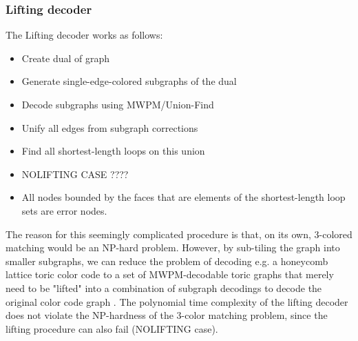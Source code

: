 \subsubsection{Lifting decoder}\label{sec: lifting}
The Lifting decoder works as follows:
\begin{itemize}
    \item Create dual of graph
    \item Generate single-edge-colored subgraphs of the dual
    \item Decode subgraphs using MWPM/Union-Find
    \item Unify all edges from subgraph corrections
    \item Find all shortest-length loops on this union
    \item NOLIFTING CASE ????
    \item All nodes bounded by the faces that are elements of the shortest-length loop sets
    are error nodes. 
\end{itemize}
The reason for this seemingly complicated procedure is that, on its
own, 3-colored matching would be an NP-hard problem. However, by sub-tiling
the graph into smaller subgraphs, we can reduce the problem of decoding
e.g. a honeycomb lattice toric color code to a set of
MWPM-decodable toric graphs that merely need to be "lifted" into a 
combination of subgraph decodings to decode the original color code
graph \cite{delfosse}. 
The polynomial time complexity of the lifting decoder does not
violate the NP-hardness of the 3-color matching problem, since the 
lifting procedure can also fail (NOLIFTING case).